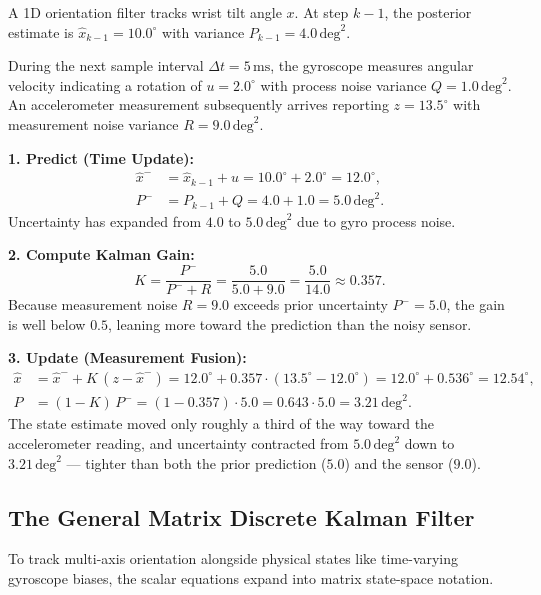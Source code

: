 \begin{example}
\label{ch36:ex-kalman}
A 1D orientation filter tracks wrist tilt angle $x$. At step $k-1$, the posterior estimate is $\hat{x}_{k-1} = 10.0^\circ$ with variance $P_{k-1} = 4.0\,\text{deg}^2$. 

During the next sample interval $\Delta t = 5\,\text{ms}$, the gyroscope measures angular velocity indicating a rotation of $u = 2.0^\circ$ with process noise variance $Q = 1.0\,\text{deg}^2$. An accelerometer measurement subsequently arrives reporting $z = 13.5^\circ$ with measurement noise variance $R = 9.0\,\text{deg}^2$.

\textbf{1. Predict (Time Update):}
\begin{align*}
  \hat{x}^- &= \hat{x}_{k-1} + u = 10.0^\circ + 2.0^\circ = 12.0^\circ , \\
  P^- &= P_{k-1} + Q = 4.0 + 1.0 = 5.0\,\text{deg}^2 .
\end{align*}
Uncertainty has expanded from $4.0$ to $5.0\,\text{deg}^2$ due to gyro process noise.

\textbf{2. Compute Kalman Gain:}
\[
  K = \frac{P^-}{P^- + R} = \frac{5.0}{5.0 + 9.0} = \frac{5.0}{14.0} \approx 0.357 .
\]
Because measurement noise $R = 9.0$ exceeds prior uncertainty $P^- = 5.0$, the gain is well below $0.5$, leaning more toward the prediction than the noisy sensor.

\textbf{3. Update (Measurement Fusion):}
\begin{align*}
  \hat{x} &= \hat{x}^- + K\, (z - \hat{x}^-) = 12.0^\circ + 0.357 \cdot (13.5^\circ - 12.0^\circ) = 12.0^\circ + 0.536^\circ = 12.54^\circ , \\
  P &= (1 - K)\, P^- = (1 - 0.357) \cdot 5.0 = 0.643 \cdot 5.0 = 3.21\,\text{deg}^2 .
\end{align*}
The state estimate moved only roughly a third of the way toward the accelerometer reading, and uncertainty contracted from $5.0\,\text{deg}^2$ down to $3.21\,\text{deg}^2$ --- tighter than both the prior prediction ($5.0$) and the sensor ($9.0$).
\end{example}

\subsection{The General Matrix Discrete Kalman Filter}
\label{ch36:kalman-matrix}

To track multi-axis orientation alongside physical states like time-varying gyroscope biases, the scalar equations expand into matrix state-space notation.

